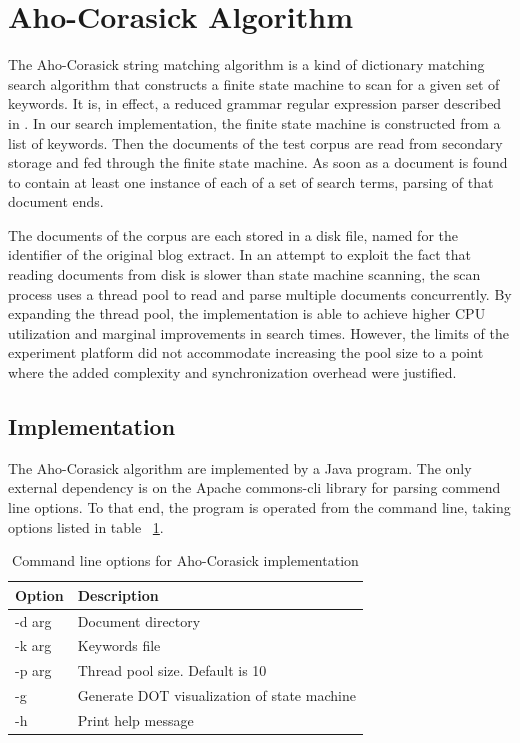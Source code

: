 \documentclass[10pt]{report}
\begin{document}
\section{Aho-Corasick Algorithm}
\label{sec:ahocorasickalgorithm}
The Aho-Corasick string matching algorithm\cite{RefWorks:103} is a
kind of dictionary matching search algorithm that constructs a finite
state machine to scan for a given set of keywords. It is, in effect, a
reduced grammar regular expression parser described in
\cite{RefWorks:111}. In our search implementation, the finite state
machine is constructed from a list of keywords. Then the documents
of the test corpus are read from secondary storage and fed through the
finite state machine. As soon as a document is found to contain at
least one instance of each of a set of search terms, parsing of that document
ends.

The documents of the corpus are each stored in a disk file, named for
the identifier of the original blog extract. In an attempt to exploit
the fact that reading documents from disk is slower than state machine
scanning, the scan process uses a thread pool to read and parse
multiple documents concurrently. By expanding the thread pool, the
implementation is able to achieve higher CPU utilization and marginal
improvements in search times. However, the limits of the experiment
platform did not accommodate increasing the pool size to a point where
the added complexity and synchronization overhead were justified.


\subsection*{Implementation}
The Aho-Corasick algorithm are implemented by a Java
program. The only external dependency is on the Apache commons-cli
library for parsing commend line options. To that end, the program is
operated from the command line, taking options listed in table
~\ref{tab:ahocommandline}.  
\\
\begin{table}[h]
  \centering
  \begin{tabular}{ |l|p{10cm}|} 
    \hline
    Option & Description \\ \hline
    -d \<arg\>  &  Document directory \\ \hline
    -k \<arg\>  &  Keywords file \\ \hline
    -p \<arg\>  &  Thread pool size. Default is 10 \\ \hline
    -g          &  Generate DOT visualization of state machine \\ \hline
    -h          &  Print help message \\ \hline
  \end{tabular}
  \caption{Command line options for Aho-Corasick implementation}
  \label{tab:ahocommandline}
\end{table}
\\
\end{document}
